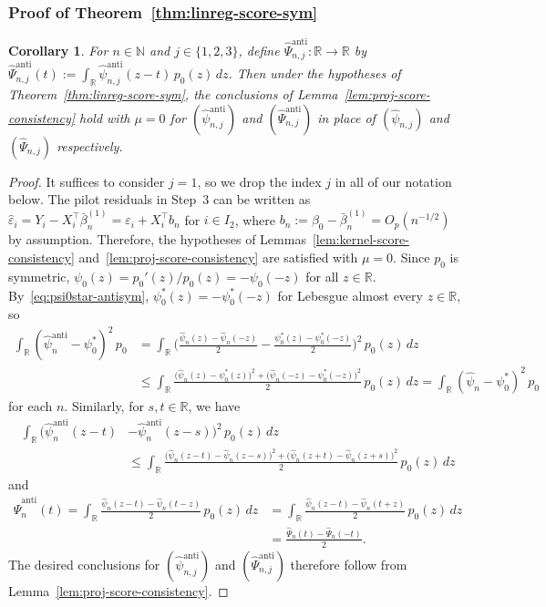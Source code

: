 \documentclass[a4paper]{article}
\newcommand{\N}{\mathbb{N}}
\newcommand{\R}{\mathbb{R}}
\newtheorem{corollary}[theorem]{Corollary}
\theoremstyle{definition}
\begin{document}
\subsubsection{Proof of Theorem~\ref{thm:linreg-score-sym}}
\label{subsec:linreg-sym-proofs}

\begin{corollary}
\label{cor:sym-score-consistency}
For $n \in \N$ and $j \in \{1,2,3\}$, define $\hat{\Psi}_{n,j}^{\mathrm{anti}} \colon \R \to \R$ by $\hat{\Psi}_{n,j}^{\mathrm{anti}}(t) := \int_\R \hat{\psi}_{n,j}^{\mathrm{anti}}(z - t)\,p_0(z)\,dz$. Then under the hypotheses of Theorem~\ref{thm:linreg-score-sym}, the conclusions of Lemma~\ref{lem:proj-score-consistency} hold with $\mu = 0$ for $(\hat{\psi}_{n,j}^{\mathrm{anti}})$ and $(\hat{\Psi}_{n,j}^{\mathrm{anti}})$ in place of $(\hat{\psi}_{n,j})$ and $(\hat{\Psi}_{n,j})$ respectively.
\end{corollary}

\begin{proof}
It suffices to consider $j = 1$, so we drop the index $j$ in all of our notation below. The pilot residuals in Step~3 can be written as $\hat{\varepsilon}_i = Y_i - X_i^\top\bar{\beta}_n^{(1)} = \varepsilon_i + X_i^\top b_n$ for $i \in I_2$, where $b_n := \beta_0 - \bar{\beta}_n^{(1)} = O_p(n^{-1/2})$ by assumption. Therefore, the hypotheses of Lemmas~\ref{lem:kernel-score-consistency} and~\ref{lem:proj-score-consistency} are satisfied with $\mu = 0$. Since $p_0$ is symmetric, $\psi_0(z) = p_0'(z)/p_0(z) = -\psi_0(-z)$ for all $z \in \R$. By~\eqref{eq:psi0star-antisym}, $\psi_0^*(z) = -\psi_0^*(-z)$ for Lebesgue almost every $z \in \R$, so
\begin{align*}
\int_\R (\hat{\psi}_n^{\mathrm{anti}} - \psi_0^*)^2\,p_0 &= \int_\R \biggl(\frac{\hat{\psi}_n(z) - \hat{\psi}_n(-z)}{2} - \frac{\psi_0^*(z) - \psi_0^*(-z)}{2}\biggr)^2\,p_0(z)\,dz \\
&\leq \int_\R \frac{\bigl(\hat{\psi}_n(z) - \psi_0^*(z)\bigr)^2 + \bigl(\hat{\psi}_n(-z) - \psi_0^*(-z)\bigr)^2}{2}\,p_0(z)\,dz = \int_\R (\hat{\psi}_n - \psi_0^*)^2\,p_0
\end{align*}
for each $n$. Similarly, for $s,t \in \R$, we have
\begin{align*}
\int_\R \bigl(\hat{\psi}_n^{\mathrm{anti}}(z - t) &- \hat{\psi}_n^{\mathrm{anti}}(z - s)\bigr)^2\,p_0(z)\,dz \\
&\leq \int_\R \frac{\bigl(\hat{\psi}_n(z - t) - \hat{\psi}_n(z - s)\bigr)^2 + \bigl(\hat{\psi}_n(z + t) - \hat{\psi}_n(z + s)\bigr)^2}{2}\,p_0(z)\,dz
\end{align*}
and
\begin{align*}
\hat{\Psi}_n^{\mathrm{anti}}(t) = \int_\R \frac{\hat{\psi}_n(z - t) - \hat{\psi}_n(t - z)}{2}\,p_0(z)\,dz &= \int_\R \frac{\hat{\psi}_n(z - t) - \hat{\psi}_n(t + z)}{2}\,p_0(z)\,dz \\
&= \frac{\hat{\Psi}_n(t) - \hat{\Psi}_n(-t)}{2}.
\end{align*}
The desired conclusions for $(\hat{\psi}_{n,j}^{\mathrm{anti}})$ and $(\hat{\Psi}_{n,j}^{\mathrm{anti}})$ therefore follow from Lemma~\ref{lem:proj-score-consistency}.
\end{proof}
\end{document}
